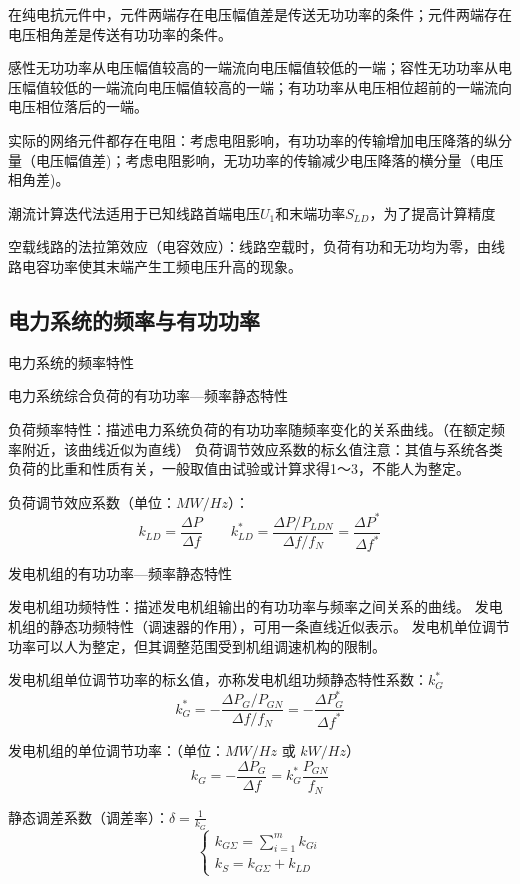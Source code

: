 \documentclass[UTF8, 12pt, a4paper]{ctexart}
\begin{document}
在纯电抗元件中，元件两端存在电压幅值差是传送无功功率的条件；元件两端存在电压相角差是传送有功功率的条件。

感性无功功率从电压幅值较高的一端流向电压幅值较低的一端；容性无功功率从电压幅值较低的一端流向电压幅值较高的一端；有功功率从电压相位超前的一端流向电压相位落后的一端。

实际的网络元件都存在电阻：考虑电阻影响，有功功率的传输增加电压降落的纵分量（电压幅值差)；考虑电阻影响，无功功率的传输减少电压降落的横分量（电压相角差)。

潮流计算迭代法适用于已知线路首端电压$U_1$和末端功率$S_{LD}$，为了提高计算精度

空载线路的法拉第效应（电容效应）：线路空载时，负荷有功和无功均为零，由线路电容功率使其末端产生工频电压升高的现象。
\subsection{电力系统的频率与有功功率}
电力系统的频率特性

电力系统综合负荷的有功功率---频率静态特性

负荷频率特性：描述电力系统负荷的有功功率随频率变化的关系曲线。（在额定频率附近，该曲线近似为直线）
负荷调节效应系数的标幺值注意：其值与系统各类负荷的比重和性质有关，一般取值由试验或计算求得1～3，不能人为整定。

负荷调节效应系数（单位：$MW/Hz$）： 
\[k _ { LD } =  \frac { \Delta P  } { \Delta f } \qquad k _ { LD } ^ { * } = \frac {  \Delta P  / P _ { LDN } } { \Delta f / f_{N} }=  \frac { \Delta P  ^ { * } } { \Delta f  ^ { * } }\]

发电机组的有功功率---频率静态特性

发电机组功频特性：描述发电机组输出的有功功率与频率之间关系的曲线。
发电机组的静态功频特性（调速器的作用），可用一条直线近似表示。
发电机单位调节功率可以人为整定，但其调整范围受到机组调速机构的限制。

发电机组单位调节功率的标幺值，亦称发电机组功频静态特性系数：$k_G^{*}$
\[k _ { G } ^ { * } = - \frac {  \Delta P _ { G } / P _ { GN } } { \Delta f / f_{N} }= - \frac { \Delta P _ { G  } ^ { * } } { \Delta f  ^ { * } }\]

发电机组的单位调节功率：（单位：$MW/Hz$ 或 $kW/Hz$）
\[k _ { G } = - \frac { \Delta P _ { G } } { \Delta f } = k_G^{*} \frac{P_{GN}}{f_N}\]

静态调差系数（调差率）：$\delta = \frac { 1 } { k _ { G } }$
\[
    \begin{cases}

        k _ { G \Sigma } = \sum _ { i = 1 } ^ { m } k_ { Gi }\\
        k _ { S } = k _ { G \Sigma } + k _ { L D }
    \end{cases}
\]
\end{document}
